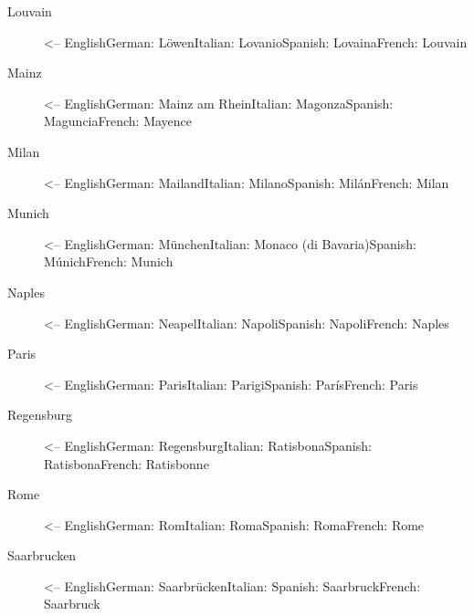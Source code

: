 \documentclass[a4paper,
10pt,
greek,
french,
spanish,
italian,
ngerman,
english
]{ltxdoc}
\begin{document}
\begin{multicols}{3}
\begin{description}
\item[Louvain] <-- English\newline German: Löwen\newline Italian: Lovanio\newline Spanish: Lovaina\newline French: Louvain
\item[Mainz] <-- English\newline German: Mainz am Rhein\newline Italian: Magonza\newline Spanish: Maguncia\newline French: Mayence
\item[Milan] <-- English\newline German: Mailand\newline Italian: Milano\newline Spanish: Milán\newline French: Milan
\item[Munich] <-- English\newline German: München\newline Italian: Monaco (di Bavaria)\newline Spanish: Múnich\newline French: Munich
\item[Naples] <-- English\newline German: Neapel\newline Italian: Napoli\newline Spanish: Napoli\newline French: Naples
\item[Paris] <-- English\newline German: Paris\newline Italian: Parigi\newline Spanish: París\newline French: Paris
\item[Regensburg] <-- English\newline German: Regensburg\newline Italian: Ratisbona\newline Spanish: Ratisbona\newline French: Ratisbonne
\item[Rome] <-- English\newline German: Rom\newline Italian: Roma\newline Spanish: Roma\newline French: Rome
\item[Saarbrucken] <-- English\newline German: Saarbrücken\newline Italian: \newline Spanish: Saarbruck\newline French: Saarbruck

\end{description}
\end{multicols}
\end{document}
